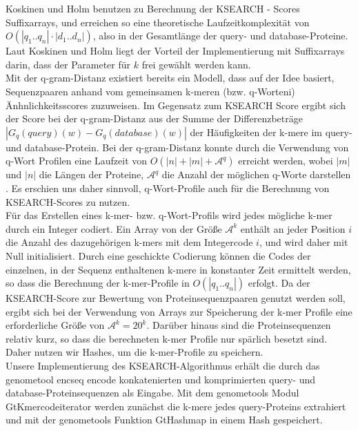 \documentclass{article}
\begin{document}
Koskinen und Holm benutzen zu Berechnung der KSEARCH - Scores Suffixarrays, und erreichen so eine theoretische Laufzeitkomplexität von $O(|q_1..q_n| \cdot |d_1..d_n|)$, also in der Gesamtlänge der query- und database-Proteine. Laut Koskinen und Holm liegt der Vorteil der Implementierung mit Suffixarrays darin, dass der Parameter für $k$ frei gewählt werden kann. \\
Mit der q-gram-Distanz existiert bereits ein Modell, dass auf der Idee basiert,
Sequenzpaaren anhand vom gemeinsamen k-meren (bzw. q-Worteni) Änhnlichkeitsscores zuzuweisen. 
Im Gegensatz zum KSEARCH Score ergibt sich der Score bei der q-gram-Distanz aus der Summe der Differenzbeträge $|G_q(query)(w) - G_q(database)(w)|$ der Häufigkeiten der k-mere im query- und database-Protein. 
Bei der q-gram-Distanz konnte durch die Verwendung von q-Wort Profilen eine
Laufzeit von $O(|n|+|m|+\mathcal{A}^q)$ erreicht werden, wobei $|m|$ und $|n|$
die Längen der Proteine, $\mathcal{A}^q$ die Anzahl der möglichen q-Worte
darstellen \cite{GSA}. Es erschien uns daher sinnvoll, q-Wort-Profile auch für die Berechnung von KSEARCH-Scores zu nutzen.\\
Für das Erstellen eines k-mer- bzw. q-Wort-Profils wird jedes mögliche k-mer durch ein Integer codiert. Ein Array von der Größe $\mathcal{A}^k$ enthält an jeder Position $i$ die Anzahl des dazugehörigen k-mers mit dem Integercode $i$, und wird daher mit Null initialisiert. Durch eine geschickte Codierung können die Codes der einzelnen, in der Sequenz enthaltenen k-mere in konstanter Zeit ermittelt werden, so dass die Berechnung der k-mer-Profile in ${O(|q_1..q_n|)}$ erfolgt. Da der KSEARCH-Score zur Bewertung von Proteinsequenzpaaren genutzt werden soll, ergibt sich bei der Verwendung von Arrays zur Speicherung der k-mer Profile eine erforderliche Größe von $\mathcal{A}^k = 20^k$. Darüber hinaus sind die Proteinsequenzen relativ kurz, so dass die berechneten k-mer Profile nur spärlich besetzt sind. Daher nutzen wir Hashes, um die k-mer-Profile zu speichern. \\
Unsere Implementierung des KSEARCH-Algorithmus erhält die durch das genometool encseq encode konkatenierten und komprimierten query- und database-Proteinsequenzen als Eingabe. Mit dem genometools Modul GtKmercodeiterator werden zunächst die k-mere jedes query-Proteins extrahiert und mit der genometools Funktion GtHashmap in einem Hash gespeichert.
\end{document}

